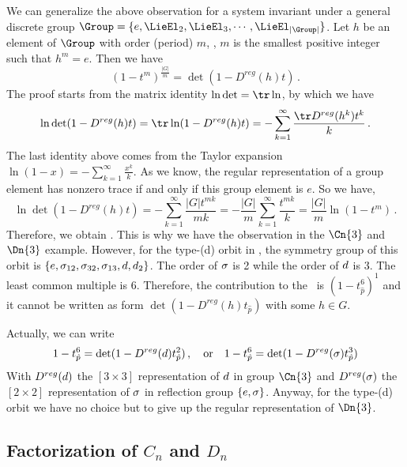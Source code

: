 We can generalize the above observation for a system invariant under
a general discrete group
$\Group=\{e, \LieEl_2, \LieEl_3,\cdots, \LieEl_{|\Group|}\}$.
Let $h$ be an element of $\Group$
with order (period) $m$, \ie, $m$ is the smallest positive integer such
that $h^m = e$. Then we have
\begin{equation}
  \label{eq:symfac}
  (1 - t^m)^{\frac{|G|}{m}} = \det(1 - D^{reg}(h)t)
  \,.
\end{equation}
The proof starts from the matrix identity $\ln\det = \tr\ln$, by which we have
\[
  \ln \det(1 - D^{reg}(h)t) = \tr \ln (1 - D^{reg}(h)t)
  = -\sum_{k=1}^\infty \frac{\tr D^{reg}(h^k)t^k}{k}
  \,.
\]
The last identity above comes from the Taylor expansion
$\ln(1-x) = -\sum_{k=1}^\infty \frac{x^k}{k}$.
As we know, the regular representation of
a group element has nonzero trace if and only if this group element is
$e$. So we have,
\[
  \ln \det(1 - D^{reg}(h)t) =  -\sum_{k=1}^\infty \frac{|G|t^{mk}}{mk}
  =  -\frac{|G|}{m}\sum_{k=1}^\infty \frac{t^{mk}}{k}
  = \frac{|G|}{m} \ln (1 - t^m)
  \,.
\]
Therefore, we obtain . This is why we have the observation
in the $\Cn{3}$ and $\Dn{3}$ example. However, for the type-(d) orbit in
, the symmetry group of this orbit is
$\{e, \sigma_{12}, \sigma_{32}, \sigma_{13}, d, d_2\}$. The order of
$\sigma$ is 2 while the order of $d$ is 3. The least common multiple is
6. Therefore, the contribution to the \dzeta\ is $(1-t_{\hat{p}}^6)^{1}$ and it
cannot be written as form $\det(1 - D^{reg}(h)t_{\hat{p}})$ with some $h\in G$.

Actually, we can write
\[
  1-t_{\hat{p}}^6 = \det(1 - D^{reg}(d)t_{\hat{p}}^2) \,,\quad
  \text{or} \quad
  1-t_{\hat{p}}^6 = \det(1 - D^{reg}(\sigma)t_{\hat{p}}^3)
\]
With $D^{reg}(d)$ the $[3\times 3]$ representation of $d$ in group $\Cn{3}$
and $ D^{reg}(\sigma)$ the $[2\times 2]$ representation of $\sigma$ in
reflection group $\{e, \sigma\}$. Anyway, for the type-(d) orbit we
have no choice but to give up the regular representation of $\Dn{3}$.

\subsection{Factorization of $C_n$ and $D_n$}

